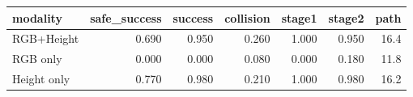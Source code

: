 \begin{tabular}{lrrrrrr}
\toprule
modality & safe_success & success & collision & stage1 & stage2 & path \\
\midrule
RGB+Height & 0.690 & 0.950 & 0.260 & 1.000 & 0.950 & 16.4 \\
RGB only & 0.000 & 0.000 & 0.080 & 0.000 & 0.180 & 11.8 \\
Height only & 0.770 & 0.980 & 0.210 & 1.000 & 0.980 & 16.2 \\
\bottomrule
\end{tabular}
